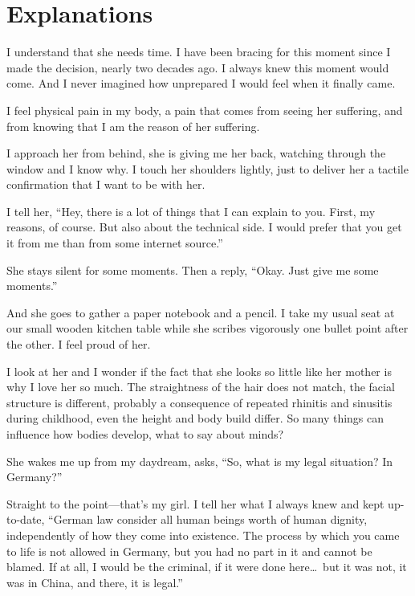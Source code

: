 \chapter*{Explanations}\label{explanations}

I understand that she needs time. I have been bracing for this moment since I made the decision, nearly two decades ago. I always knew this moment would come. And I never imagined how unprepared I would feel when it finally came.

I feel physical pain in my body, a pain that comes from seeing her suffering, and from knowing that I am the reason of her suffering.

I approach her from behind, she is giving me her back, watching through the window and I know why. I touch her shoulders lightly, just to deliver her a tactile confirmation that I want to be with her. 

I tell her, \enquote{Hey, there is a lot of things that I can explain to you. First, my reasons, of course. But also about the technical side. I would prefer that you get it from me than from some internet source.}

She stays silent for some moments. Then a reply, \enquote{Okay. Just give me some moments.}

And she goes to gather a paper notebook and a pencil. I take my usual seat at our small wooden kitchen table while she scribes vigorously one bullet point after the other. I feel proud of her. 

I look at her and I wonder if the fact that she looks so little like her mother is why I love her so much. The straightness of the hair does not match, the facial structure is different, probably a consequence of repeated rhinitis and sinusitis during childhood, even the height and body build differ. So many things can influence how bodies develop, what to say about minds?

She wakes me up from my daydream, asks, \enquote{So, what is my legal situation? In Germany?}

Straight to the point---that's my girl. I tell her what I always knew and kept up-to-date, \enquote{German law consider all human beings worth of human dignity, independently of how they come into existence. The process by which you came to life is not allowed in Germany, but you had no part in it and cannot be blamed. If at all, I would be the criminal, if it were done here\dots~but it was not, it was in China, and there, it is legal.}

